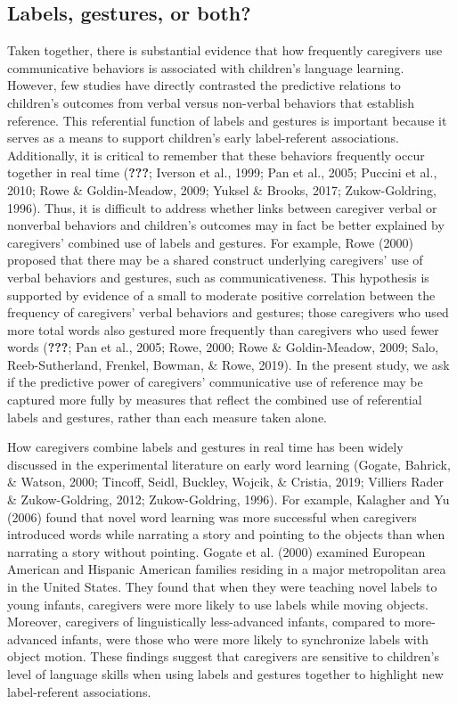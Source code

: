 \documentclass[
  english,
  man,mask]{apa6}
\begin{document}
\hypertarget{labels-gestures-or-both}{%
\subsection{Labels, gestures, or both?}\label{labels-gestures-or-both}}

Taken together, there is substantial evidence that how frequently caregivers use communicative behaviors is associated with children's language learning. However, few studies have directly contrasted the predictive relations to children's outcomes from verbal versus non-verbal behaviors that establish reference. This referential function of labels and gestures is important because it serves as a means to support children's early label-referent associations. Additionally, it is critical to remember that these behaviors frequently occur together in real time ({\textbf{???}}; Iverson et al., 1999; Pan et al., 2005; Puccini et al., 2010; Rowe \& Goldin-Meadow, 2009; Yuksel \& Brooks, 2017; Zukow-Goldring, 1996). Thus, it is difficult to address whether links between caregiver verbal or nonverbal behaviors and children's outcomes may in fact be better explained by caregivers' combined use of labels and gestures. For example, Rowe (2000) proposed that there may be a shared construct underlying caregivers' use of verbal behaviors and gestures, such as communicativeness. This hypothesis is supported by evidence of a small to moderate positive correlation between the frequency of caregivers' verbal behaviors and gestures; those caregivers who used more total words also gestured more frequently than caregivers who used fewer words ({\textbf{???}}; Pan et al., 2005; Rowe, 2000; Rowe \& Goldin-Meadow, 2009; Salo, Reeb-Sutherland, Frenkel, Bowman, \& Rowe, 2019). In the present study, we ask if the predictive power of caregivers' communicative use of reference may be captured more fully by measures that reflect the combined use of referential labels and gestures, rather than each measure taken alone.

How caregivers combine labels and gestures in real time has been widely discussed in the experimental literature on early word learning (Gogate, Bahrick, \& Watson, 2000; Tincoff, Seidl, Buckley, Wojcik, \& Cristia, 2019; Villiers Rader \& Zukow-Goldring, 2012; Zukow-Goldring, 1996). For example, Kalagher and Yu (2006) found that novel word learning was more successful when caregivers introduced words while narrating a story and pointing to the objects than when narrating a story without pointing. Gogate et al. (2000) examined European American and Hispanic American families residing in a major metropolitan area in the United States. They found that when they were teaching novel labels to young infants, caregivers were more likely to use labels while moving objects. Moreover, caregivers of linguistically less-advanced infants, compared to more-advanced infants, were those who were more likely to synchronize labels with object motion. These findings suggest that caregivers are sensitive to children's level of language skills when using labels and gestures together to highlight new label-referent associations.
\end{document}

